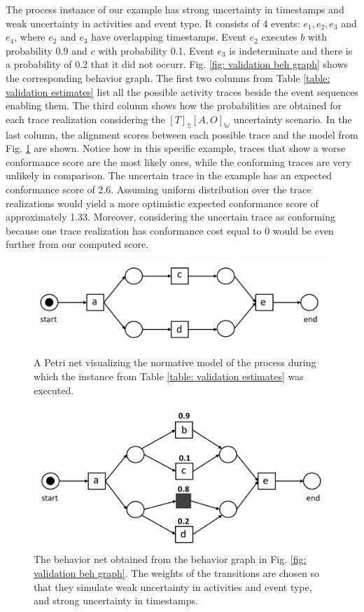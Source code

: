 The process instance of our example has strong uncertainty in timestamps and weak uncertainty in activities and event type.
It consists of 4 events: $e_1,e_2,e_3$ and $e_4$, where $e_2$ and $e_3$ have overlapping timestamps.
Event $e_2$ executes $b$ with probability 0.9 and $c$ with probability 0.1.
Event $e_3$ is indeterminate and there is a probability of 0.2 that it did not occurr.
Fig. \ref{fig: validation beh graph} shows the corresponding behavior graph.
The first two columns from Table \ref{table: validation estimates} list all the possible activity traces beside the event sequences enabling them.
The third column shows how the probabilities are obtained for each trace realization considering the $[T]_{\mathbb{S}}[A,O]_{\mathbb{W}}$ uncertainty scenario.
In the last column, the alignment scores between each possible trace and the model from Fig. \ref{fig: validation model} are shown.
Notice how in this specific example, traces that show a worse conformance score are the most likely ones, while the conforming traces are very unlikely in comparison.
The uncertain trace in the example has an expected conformance score of 2.6.
Assuming uniform distribution over the trace realizations would yield a more optimistic expected conformance score of approximately 1.33.
Moreover, considering the uncertain trace as conforming because one trace realization has conformance cost equal to 0 would be even further from our computed score.

%
%
%
\begin{figure}
	\centering
	\includegraphics[width=0.8\columnwidth]{figures/model_validation.png}
	\caption{A Petri net visualizing the normative model of the process during which the instance from Table \ref{table: validation estimates} was executed.}
	\label{fig: validation model}
\end{figure}
%
%
%
%
%
%
\begin{figure}
	\centering
	\includegraphics[width=0.8\columnwidth]{figures/behaviornet.png}
	\caption{The behavior net obtained from the behavior graph in Fig. \ref{fig: validation beh graph}.
	The weights of the transitions are chosen so that they simulate weak uncertainty in activities and event type, and strong uncertainty in timestamps.}
	\label{fig: behavior net}
\end{figure}
%
%
%
%
%
%

